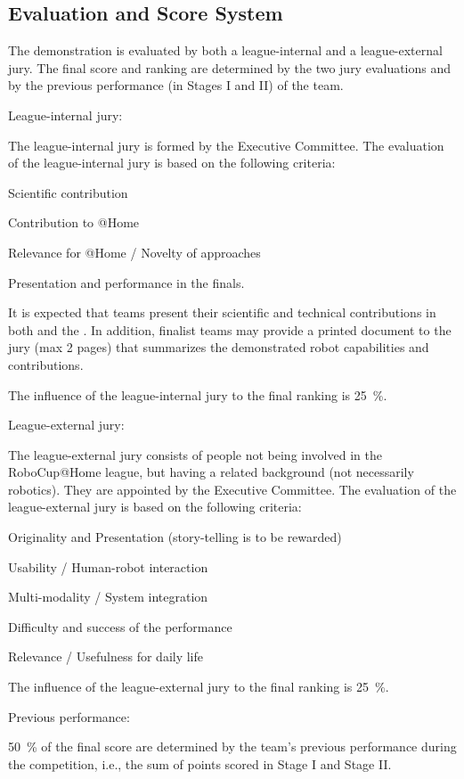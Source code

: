 \subsection{Evaluation and Score System}
The demonstration is evaluated by both a league-internal and a league-external jury.
The final score and ranking are determined by the two jury evaluations and by the previous performance (in Stages I and II) of the team.
\begin{enumerate}
{\bf\item League-internal jury:} The league-internal jury is formed by the Executive Committee.
The evaluation of the league-internal jury is based on the following criteria:
  \begin{compactenum}
  \item Scientific contribution %
  \item Contribution to @Home %
  \item Relevance for @Home / Novelty of approaches %
  \item Presentation and performance in the finals.
  \end{compactenum}
It is expected that teams present their scientific and technical contributions in both  and the .
In addition, finalist teams may provide a printed document to the jury (max 2 pages) that summarizes the demonstrated robot capabilities and contributions.  

  The influence of the league-internal jury to the final ranking is \SI{25}{\percent}.

{\bf\item League-external jury:} The league-external jury consists of people not being involved in the RoboCup@Home league,
but having a related background (not necessarily robotics).
They are appointed by the Executive Committee.
The evaluation of the league-external jury is based on the following criteria:
  \begin{compactenum}
  \item Originality and Presentation
    (story-telling is to be rewarded)
  \item Usability / Human-robot interaction
  \item Multi-modality / System integration
  \item Difficulty and success of the performance
  \item Relevance / Usefulness for daily life
  \end{compactenum}
  The influence of the league-external jury to the final ranking is \SI{25}{\percent}.

{\bf\item Previous performance:} \SI{50}{\percent} of the final score are determined by the team's previous performance during the competition, i.e., 
the sum of points scored in Stage I and Stage II.
\end{enumerate}

